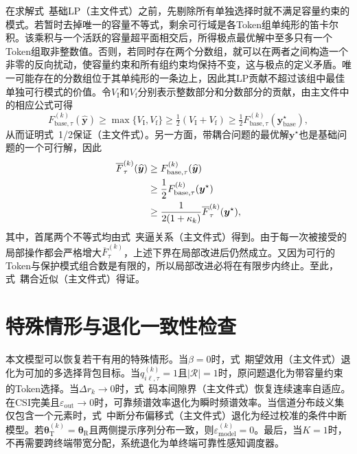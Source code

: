 \documentclass[journal]{IEEEtran}
\begin{document}
在求解式~基础LP（主文件式）之前，先剔除所有单独选择时就不满足容量约束的模式。若暂时去掉唯一的容量不等式，剩余可行域是各Token组单纯形的笛卡尔积。该乘积与一个活跃的容量超平面相交后，所得极点最优解中至多只有一个Token组取非整数值。否则，若同时存在两个分数组，就可以在两者之间构造一个非零的反向扰动，使容量约束和所有组约束均保持不变，这与极点的定义矛盾。唯一可能存在的分数组位于其单纯形的一条边上，因此其LP贡献不超过该组中最佳单独可行模式的价值。令$V_{\mathrm I}$和$V_{\mathrm f}$分别表示整数部分和分数部分的贡献，由主文件中的相应公式可得
\begin{equation}
F_{\mathrm{base},\tau}^{(k)}(\widehat{\bm y})
\geq\max\{V_{\mathrm I},V_{\mathrm f}\}
\geq\tfrac12(V_{\mathrm I}+V_{\mathrm f})
\geq\tfrac12F_{\mathrm{base},\tau}^{(k)}(\bm y_{\mathrm{base}}^{\star}),
\end{equation}
从而证明式~1/2保证（主文件式）。另一方面，带耦合问题的最优解$\bm y^{\star}$也是基础问题的一个可行解，因此
\begin{align}
\overline F_{\tau}^{(k)}(\widehat{\bm y})
&\geq F_{\mathrm{base},\tau}^{(k)}(\widehat{\bm y})
\notag\\
&\geq\frac12F_{\mathrm{base},\tau}^{(k)}(\bm y^{\star})
\notag\\
&\geq\frac{1}{2(1+\kappa_k)}
\overline F_{\tau}^{(k)}(\bm y^{\star}),
\end{align}
其中，首尾两个不等式均由式~夹逼关系（主文件式）得到。由于每一次被接受的局部操作都会严格增大$\overline F_{\tau}^{(k)}$，上述下界在局部改进后仍然成立。又因为可行的Token与保护模式组合数是有限的，所以局部改进必将在有限步内终止。至此，式~耦合近似（主文件式）得证。

\section{特殊情形与退化一致性检查}
\label{app:degenerate}

本文模型可以恢复若干有用的特殊情形。当$\beta=0$时，式~期望效用（主文件式）退化为可加的多选择背包目标。当$q_{i\ell,\tau}^{(k)}=1$且$|\mathcal R|=1$时，原问题退化为带容量约束的Token选择。当$\Delta r_k\rightarrow0$时，式~码本间隙界（主文件式）恢复连续速率自适应。在CSI完美且$\varepsilon_{\mathrm{out}}\rightarrow0$时，可靠频谱效率退化为瞬时频谱效率。当信道分布歧义集仅包含一个元素时，式~中断分布偏移式（主文件式）退化为经过校准的条件中断模型。若$\bm\theta_{\mathrm T}^{(k)}=\bm\theta_{\mathrm R}$且两侧提示序列分布一致，则$\varepsilon_{\mathrm{model}}^{(k)}=0$。最后，当$K=1$时，不再需要跨终端带宽分配，系统退化为单终端可靠性感知调度器。
\end{document}
